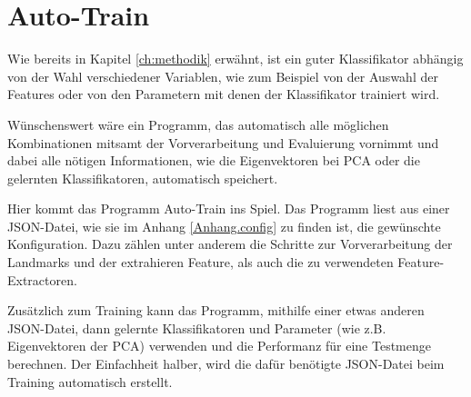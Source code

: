\section{Auto-Train}
Wie bereits in Kapitel \ref{ch:methodik} erwähnt, ist ein guter Klassifikator abhängig von der Wahl verschiedener Variablen, wie zum Beispiel
von der Auswahl der Features oder von den Parametern mit denen der Klassifikator trainiert wird.

Wünschenswert wäre ein Programm, das automatisch alle möglichen Kombinationen mitsamt der Vorverarbeitung und Evaluierung vornimmt und dabei alle nötigen Informationen, wie die Eigenvektoren bei PCA oder die gelernten Klassifikatoren, automatisch speichert.

Hier kommt das Programm Auto-Train ins Spiel. Das Programm liest aus einer JSON-Datei, wie sie im Anhang \ref{Anhang.config} zu finden ist, die gewünschte Konfiguration. Dazu zählen unter anderem die Schritte zur Vorverarbeitung der Landmarks und der extrahieren Feature, als auch die zu verwendeten Feature-Extractoren. 

Zusätzlich zum Training kann das Programm, mithilfe einer etwas anderen JSON-Datei, dann gelernte Klassifikatoren und Parameter (wie z.B. Eigenvektoren der PCA) verwenden und die Performanz für eine Testmenge berechnen.
Der Einfachheit halber, wird die dafür benötigte JSON-Datei beim Training automatisch erstellt.





